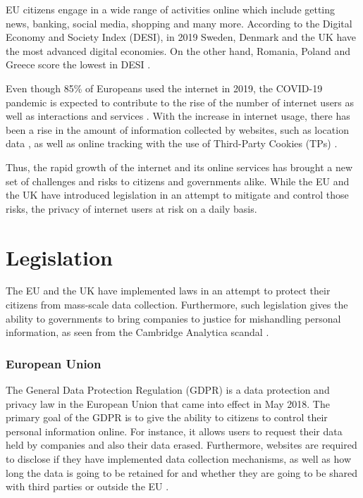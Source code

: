 \documentclass[../main.tex]{subfiles}
\begin{document}
EU citizens engage in a wide range of activities online which include getting news, banking, social media, shopping and many more. According to the Digital Economy and Society Index (DESI), in 2019 Sweden, Denmark and the UK have the most advanced digital economies. On the other hand, Romania, Poland and Greece score the lowest in DESI \cite{desi_2019}.

Even though 85\% of Europeans used the internet in 2019, the COVID-19 pandemic is expected to contribute to the rise of the number of internet users as well as interactions and services \cite{desi_2020}. With the increase in internet usage, there has been a rise in the amount of information collected by websites, such as location data \cite{hern_2018}, as well as online tracking with the use of Third-Party Cookies (TPs) \cite{roesner_2012}. 

Thus, the rapid growth of the internet and its online services has brought a new set of challenges and risks to citizens and governments alike. While the EU and the UK have introduced legislation in an attempt to mitigate and control those risks, the privacy of internet users at risk on a daily basis. 

\section{Legislation}
The EU and the UK have implemented laws in an attempt to protect their citizens from mass-scale data collection. Furthermore, such legislation gives the ability to governments to bring companies to justice for mishandling personal information, as seen from the Cambridge Analytica scandal \cite{guardian_analytica}.

\subsubsection{European Union}
The General Data Protection Regulation (GDPR) is a data protection and privacy law in the European Union that came into effect in May 2018. The primary goal of the GDPR is to give the ability to citizens to control their personal information online. For instance, it allows users to request their data held by companies and also their data erased. Furthermore, websites are required to disclose if they have implemented data collection mechanisms, as well as how long the data is going to be retained for and whether they are going to be shared with third parties or outside the EU \cite{gdpr_legal_text}.
\end{document}
